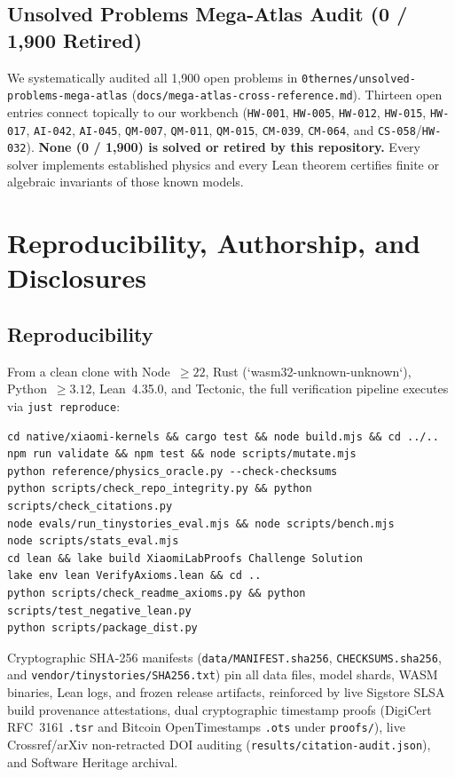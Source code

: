 \documentclass[11pt,a4paper]{amsart}
\newcommand{\code}[1]{{\small\nolinkurl{#1}}}
\theoremstyle{remark}
\begin{document}
\subsection{Unsolved Problems Mega-Atlas Audit (0 / 1,900 Retired)}
We systematically audited all 1,900 open problems in
\code{0thernes/unsolved-problems-mega-atlas} (\code{docs/mega-atlas-cross-reference.md}).
Thirteen open entries connect topically to our workbench (\code{HW-001},
\code{HW-005}, \code{HW-012}, \code{HW-015}, \code{HW-017},
\code{AI-042}, \code{AI-045}, \code{QM-007}, \code{QM-011},
\code{QM-015}, \code{CM-039}, \code{CM-064}, and \code{CS-058}/\code{HW-032}).
\textbf{None (0 / 1,900) is solved or retired by this repository.} Every solver
implements established physics and every Lean theorem certifies finite or
algebraic invariants of those known models.

\section{Reproducibility, Authorship, and Disclosures}

\subsection{Reproducibility}
From a clean clone with Node~$\ge 22$, Rust (`wasm32-unknown-unknown`),
Python~$\ge 3.12$, Lean~4.35.0, and Tectonic, the full verification pipeline
executes via \texttt{just reproduce}:
{\footnotesize
\begin{verbatim}
cd native/xiaomi-kernels && cargo test && node build.mjs && cd ../..
npm run validate && npm test && node scripts/mutate.mjs
python reference/physics_oracle.py --check-checksums
python scripts/check_repo_integrity.py && python scripts/check_citations.py
node evals/run_tinystories_eval.mjs && node scripts/bench.mjs
node scripts/stats_eval.mjs
cd lean && lake build XiaomiLabProofs Challenge Solution
lake env lean VerifyAxioms.lean && cd ..
python scripts/check_readme_axioms.py && python scripts/test_negative_lean.py
python scripts/package_dist.py
\end{verbatim}
}
Cryptographic SHA-256 manifests (\code{data/MANIFEST.sha256},
\code{CHECKSUMS.sha256}, and \code{vendor/tinystories/SHA256.txt}) pin all
data files, model shards, WASM binaries, Lean logs, and frozen release
artifacts, reinforced by live Sigstore SLSA build provenance attestations, dual
cryptographic timestamp proofs (DigiCert RFC~3161 \code{.tsr} and Bitcoin
OpenTimestamps \code{.ots} under \code{proofs/}), live Crossref/arXiv
non-retracted DOI auditing (\code{results/citation-audit.json}), and Software
Heritage archival.
\end{document}
